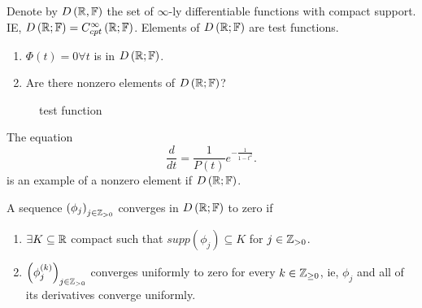 \begin{definition}
	Denote by $D\left( \mathbb{R}, \mathbb{F} \right) $ the set of $\infty$-ly differentiable functions with compact support. IE, $D\left( \mathbb{R}; \mathbb{F} \right) = C^{\infty}_{cpt}\left( \mathbb{R}; \mathbb{F} \right) $. Elements of $D\left( \mathbb{R}; \mathbb{F} \right) $ are test functions. 
\end{definition}

\begin{example}
	\begin{enumerate}
		\item $\Phi\left( t \right) = 0 \forall  t $ is in $D\left( \mathbb{R};\mathbb{F} \right) $.
		\item Are there nonzero elements of $D\left( \mathbb{R}; \mathbb{F} \right) $?
			
	\end{enumerate}
\begin{figure}[ht]
    \centering
    \caption{test function}
    \label{fig:test-function}
\end{figure}

The equation
\[
	\frac{d}{dt} = \frac{1}{P\left( t \right) } e ^{-\frac{1}{1 - t^2}}
.\] 	
is an example of a nonzero element if $D\left( \mathbb{R};\mathbb{F} \right) $. 
\end{example}

\begin{definition}
	A sequence $\left( \phi_{j} \right) _{j \in \mathbb{Z}_{>0}}$ converges in $D\left( \mathbb{R}; \mathbb{F} \right) $ to zero if 
	\begin{enumerate}
		\item $\exists K \subseteq \mathbb{R} $ compact such that $supp\left( \phi_{j} \right) \subseteq K$ for $j \in  \mathbb{Z}_{>0}$. 
		\item $\left( \phi_{j}^{\left( k \right) } \right) _{j \in  \mathbb{Z} _{>0}}$ converges uniformly to zero for every $k \in  \mathbb{Z}_{\ge 0}$, ie, $\phi_{j}$ and all of its derivatives converge uniformly. 
	\end{enumerate}
\end{definition}
